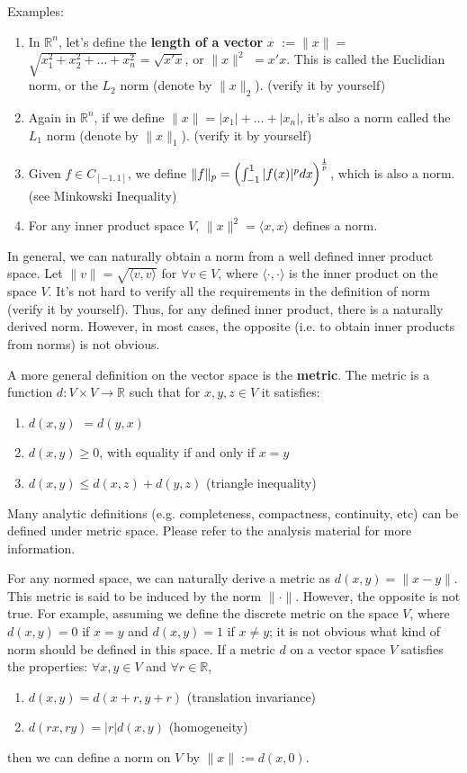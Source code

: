 \documentclass[12pt,oneside]{article}
\begin{document}
\noindent Examples:
\begin{enumerate}
\item In ${\mathbb{R}}^n$, let's define the \textbf{length of a vector} $x$ $ := \|x\| = $ $\sqrt{x_{1}^2 + x_{2}^2 + \ldots + x_{n}^2} = \sqrt{x'x}$, or $\|x\|^2$ $= x'x$. This is called the Euclidian norm, or the $L_2$ norm (denote by $\|x\|_2$). (verify it by yourself)
\item Again in ${\mathbb{R}}^n$, if we define $\|x\|=|x_1|+\ldots+|x_n|$, it's also a norm called the $L_1$ norm (denote by $\|x\|_1$). (verify it by yourself)
\item Given $f\in C_{[-1, 1]}$, we define $\|f\|_p=\left(\int_{-1}^1 |f(x)|^p dx \right)^{1\over p}$, which is also a norm. (see Minkowski Inequality)
\item For any inner product space \( V\), \(\|x\|^2= \langle x,x \rangle \) defines a norm.
\end{enumerate}

In general, we can naturally obtain a norm from a well defined inner product space.
Let $\|v\|=\sqrt{\langle v,v \rangle}$ for $\forall v\in V$, where $\langle \cdot,\cdot \rangle$ is the inner product on the space $V$.
It's not hard to verify all the requirements in the definition of norm (verify it by yourself).
Thus, for any defined inner product, there is a naturally derived norm.
However, in most cases, the opposite (i.e. to obtain inner products from norms) is not obvious.

A more general definition on the vector space is the \textbf{metric}. 
The metric is a function $d: V\times V\rightarrow \mathbb{R}$ such that for $x,y,z \in V$ it satisfies:
\begin{enumerate}
\item $d(x,y)$ $= d(y,x)$
\item $d(x,y) \geq 0$, with equality if and only if $x=y$
\item $d(x,y)\leq d(x,z)+d(y,z)$ (triangle inequality)
\end{enumerate}
Many analytic definitions (e.g. completeness, compactness, continuity, etc) can be defined under metric space.
Please refer to the analysis material for more information.

For any normed space, we can naturally derive a metric as $d(x,y)=\|x-y\|$. This metric is said to be induced by the norm $\|\cdot\|$. However, the opposite is not true. For example, assuming we define the discrete metric on the space $V$, where $d(x,y)=0$ if $x=y$ and $d(x,y)=1$ if $x\neq y$; it is not obvious what kind of norm should be defined in this space.
If a metric $d$ on a vector space $V$ satisfies the properties:
$\forall x, y\in V$ and $\forall r \in \mathbb{R}$,
\begin{enumerate}
\item $d(x,y) = d(x + r, y+r)$ (translation invariance)
\item $d(rx, ry) = |r| d(x, y)$ (homogeneity)
\end{enumerate}
then we can define a norm on $V$ by $\|x\| := d(x,0)$.\\
\end{document}

